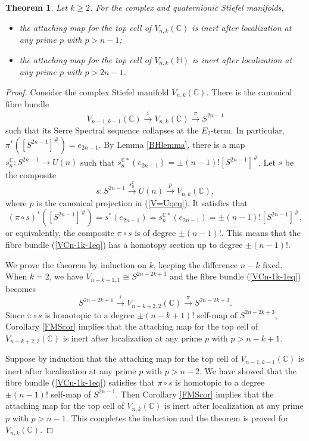 \documentclass[a4]{amsart}
\newtheorem{theorem}{Theorem}[section]
\theoremstyle{definition}
\begin{document}
\begin{sloppypar}
\begin{theorem}\label{VCHthm}
Let $k\geq 2$. For the complex and quaternionic Stiefel manifolds, 
\begin{itemize}
\item
the attaching map for the top cell of $V_{n,k}(\mathbb{C})$ is inert after localization at any prime $p$ with $p>n-1$;
\item
 the attaching map for the top cell of $V_{n,k}(\mathbb{H})$ is inert after localization at any prime $p$ with $p>2n-1$.
 \end{itemize}
\end{theorem}
\begin{proof}
Consider the complex Stiefel manifold $V_{n,k}(\mathbb{C})$. 
There is the canonical fibre bundle 
\begin{equation}\label{VCn-1k-1eq}
V_{n-1,k-1}(\mathbb{C})\stackrel{i}{\longrightarrow}V_{n,k}(\mathbb{C}) \stackrel{\pi}{\longrightarrow} S^{2n-1}
\end{equation}
such that its Serre Spectral sequence collapses at the $E_2$-term. In particular, $\pi^\ast ([S^{2n-1}]^{\#})=e_{2n-1}$. By Lemma \ref{BHlemma}, there is a map $s_n^{\mathbb{C}}: S^{2n-1}\stackrel{}{\longrightarrow}  U(n)$ such that $s_n^{\mathbb{C}\ast}(e_{2n-1})=\pm (n-1)! [S^{2n-1}]^{\#}$. Let $s$ be the composite 
\[
s: S^{2n-1}\stackrel{s_n^{\mathbb{C}}}{\longrightarrow}U(n)\stackrel{p}{\longrightarrow}  V_{n,k}(\mathbb{C}),
\]
where $p$ is the canonical projection in (\ref{V=Uqeq}).  
It satisfies that
\[
(\pi \circ s)^\ast([S^{2n-1}]^{\#})=s^\ast(e_{2n-1})=s_n^{\mathbb{C}\ast}(e_{2n-1})=\pm (n-1)! [S^{2n-1}]^{\#},
\]
or equivalently, the composite $\pi \circ s$ is of degree $\pm (n-1)!$. This means that the fibre bundle (\ref{VCn-1k-1eq}) has a homotopy section up to degree $\pm (n-1)!$. 

We prove the theorem by induction on $k$, keeping the difference $n-k$ fixed.  
When $k=2$, we have $V_{n-k+1, 1}\cong S^{2n-2k+1}$ and the fibre bundle (\ref{VCn-1k-1eq}) becomes
\[
S^{2n-2k+1}\stackrel{i}{\longrightarrow}V_{n-k+2,2}(\mathbb{C}) \stackrel{\pi}{\longrightarrow} S^{2n-2k+3}.
\]
Since $\pi\circ s$ is homotopic to a degree $\pm (n-k+1)!$ self-map of $S^{2n-2k+3}$, Corollary \ref{FMScor} implies that the attaching map for the top cell of $V_{n-k+2,2}(\mathbb{C})$ is inert after localization at any prime $p$ with $p>n-k+1$.

Suppose by induction that the attaching map for the top cell of $V_{n-1,k-1}(\mathbb{C})$ is inert after localization at any prime $p$ with $p>n-2$. We have showed that the fibre bundle (\ref{VCn-1k-1eq}) satisfies that $\pi\circ s$ is homotopic to a degree $\pm (n-1)!$ self-map of $S^{2n-1}$. Then Corollary \ref{FMScor} implies that the attaching map for the top cell of $V_{n,k}(\mathbb{C})$ is inert after localization at any prime $p$ with $p>n-1$. 
This completes the induction and the theorem is proved for $V_{n,k}(\mathbb{C})$.


\end{proof}
\end{sloppypar}
\end{document}
